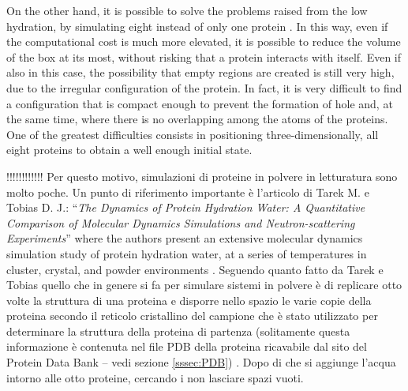 On the other hand, it is possible to solve the problems raised from the low hydration, by simulating eight instead of only one protein \cite{tarek2000dynamics}. In this way, even if the computational cost is much more elevated, it is possible to reduce the volume of the box at its most, without risking that a protein interacts with itself. Even if also in this case, the possibility that empty regions are created is still very high, due to the irregular configuration of the protein. In fact, it is very difficult to find a configuration that is compact enough to prevent the formation of hole and, at the same time, where there is no overlapping among the atoms of the proteins. One of the greatest difficulties consists in positioning three-dimensionally, all eight proteins to obtain a well enough initial state.

!!!!!!!!!!!!
Per questo motivo, simulazioni di proteine in polvere in letturatura sono molto poche. Un punto di riferimento importante è l'articolo di Tarek M. e Tobias D. J.: ``\textit{The Dynamics of Protein Hydration Water: A Quantitative Comparison of Molecular Dynamics Simulations and Neutron-scattering Experiments}'' where the authors present an extensive molecular dynamics simulation study of protein hydration water, at a series of temperatures in cluster, crystal, and powder environments \cite{tarek2000dynamics}.
Seguendo quanto fatto da Tarek e Tobias quello che in genere si fa per simulare sistemi in polvere è di replicare otto volte la struttura di una proteina e disporre nello spazio le varie copie della proteina secondo il reticolo cristallino del campione che è stato utilizzato per determinare la struttura della proteina di partenza (solitamente questa informazione è contenuta nel file PDB della proteina ricavabile dal sito del Protein Data Bank -- vedi sezione \ref{sssec:PDB}) \cite{rahaman2017configurational}. Dopo di che si aggiunge l'acqua intorno alle otto proteine, cercando i non lasciare spazi vuoti.

